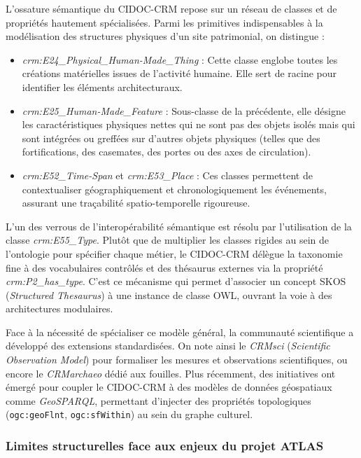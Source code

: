 \documentclass{article}
\begin{document}
L'ossature sémantique du CIDOC-CRM repose sur un réseau de classes et de propriétés hautement spécialisées. Parmi les primitives indispensables à la modélisation des structures physiques d'un site patrimonial, on distingue :
\begin{itemize}
    \item \textit{crm:E24\_Physical\_Human-Made\_Thing} : Cette classe englobe toutes les créations matérielles issues de l'activité humaine. Elle sert de racine pour identifier les éléments architecturaux.
    \item \textit{crm:E25\_Human-Made\_Feature} : Sous-classe de la précédente, elle désigne les caractéristiques physiques nettes qui ne sont pas des objets isolés mais qui sont intégrées ou greffées sur d'autres objets physiques (telles que des fortifications, des casemates, des portes ou des axes de circulation).
    \item \textit{crm:E52\_Time-Span} et \textit{crm:E53\_Place} : Ces classes permettent de contextualiser géographiquement et chronologiquement les événements, assurant une traçabilité spatio-temporelle rigoureuse.
\end{itemize}

L'un des verrous de l'interopérabilité sémantique est résolu par l'utilisation de la classe \textit{crm:E55\_Type}. Plutôt que de multiplier les classes rigides au sein de l'ontologie pour spécifier chaque métier, le CIDOC-CRM délègue la taxonomie fine à des vocabulaires contrôlés et des thésaurus externes via la propriété \textit{crm:P2\_has\_type}. C'est ce mécanisme qui permet d'associer un concept SKOS (\textit{Structured Thesaurus}) à une instance de classe OWL, ouvrant la voie à des architectures modulaires.

Face à la nécessité de spécialiser ce modèle général, la communauté scientifique a développé des extensions standardisées. On note ainsi le \textit{CRMsci} (\textit{Scientific Observation Model}) pour formaliser les mesures et observations scientifiques, ou encore le \textit{CRMarchaeo} dédié aux fouilles. Plus récemment, des initiatives ont émergé pour coupler le CIDOC-CRM à des modèles de données géospatiaux comme \textit{GeoSPARQL}, permettant d'injecter des propriétés topologiques (\texttt{ogc:geoFlnt}, \texttt{ogc:sfWithin}) au sein du graphe culturel.

\subsubsection{Limites structurelles face aux enjeux du projet ATLAS}
\end{document}
